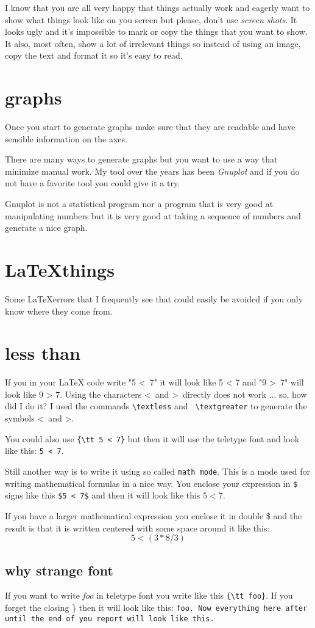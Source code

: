 \documentclass[a4paper,11pt]{article}
\begin{document}
I know that you are all very happy that things actually work and
eagerly want to show what things look like on you screen but please,
don't use {\em screen shots}. It looks ugly and it's impossible to mark or
copy the things that you want to show. It also, most often, show a lot
of irrelevant things so instead of using an image, copy the text and
format it so it's easy to read.

\section*{graphs}

Once you start to generate graphs make sure that they are readable and
have sensible information on the axes.

There are many ways to generate graphs but you want to
use a way that minimize manual work. My tool over the years has been
  {\em Gnuplot} and if you do not have a favorite tool you could give it
a try.

Gnuplot is not a statistical program nor a program that is very good at
manipulating numbers but it is very good at taking a sequence of
numbers and generate a nice graph.

\section*{\LaTeX things}

Some \LaTeX errors that I frequently see that could easily be avoided
if you only know where they come from.

\section*{less than}

If you in your LaTeX code write "5 \textless\ 7" it will look like 5 <
7 and "9 \textgreater\ 7" will look like 9 > 7. Using the characters
\textless\ and \textgreater\ directly does not work ... so, how did I
do it?  I used the commands {\tt  \textbackslash textless} and {\tt
    \textbackslash textgreater} to generate the symbols \textless\ and
\textgreater.

You could also use {\tt \{\textbackslash tt 5 < 7\}} but then it
will use the teletype font and look like this: {\tt 5 < 7}.

Still another way is to write it using so called {\tt math mode}. This
is a mode used for writing mathematical formulas in a nice way. You
enclose your expression in {\tt \$} signs like this {\tt \$5 < 7\$}
and then it will look like this $5 < 7$.

If you have a larger mathematical expression you enclose it in double
\$ and the result is that it is written centered with some space
around it like this:  $$ 5 < (3 * 8 / 3 ) $$

\subsection*{why strange font}

If you want to write {\em foo} in teletype font you write like this
\verb+{\tt foo}+. If you forget the closing \} then it will look like
this: {\tt foo. Now everything here after until the end of you report
will look like this. }
\end{document}
